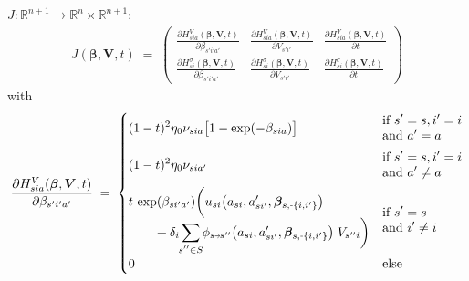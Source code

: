 \documentclass[11pt,fleqn]{article}
\newcommand{\R}{\mathbb{R}}
\newcommand{\bbeta}{\bm{\beta}}
\newcommand{\bV}{\bm{V}}
\newcommand{\shortminus}{{\text{\scalebox{0.4}[1.0]{\(-\)}}}}
\newcommand{\shortrightarrow}{\parbox{4pt}{\tikz{\draw[->](0,0)--(4pt,0);}}}
\begin{document}
$J: \R^{n+1} \rightarrow \R^n \times \R^{n+1}$:
\begin{align*}
	J(\bbeta,\bV,t) \;=\; 
		\begin{pmatrix}
			\frac{ \partial H^V_{sia}(\bbeta,\bV,t) }{ \partial\beta_{s'i'a'} } 
				& \frac{ \partial H^V_{sia}(\bbeta,\bV,t) }{ \partial V_{s'i'} } 
				& \frac{ \partial H^V_{sia}(\bbeta,\bV,t) }{ \partial t } \\[1em] 
			\frac{ \partial H^\sigma_{si}(\bbeta,\bV,t) }{ \partial \beta_{s'i'a'} } 
				& \frac{ \partial H^\sigma_{si}(\bbeta,\bV,t) }{ \partial V_{s'i'} } 
				& \frac{ \partial H^\sigma_{si}(\bbeta,\bV,t) }{ \partial t }
		\end{pmatrix} 
\end{align*}
with
\begin{align*}
	\frac{ \partial H^V_{sia}(\bbeta,\bV,t) }{ \partial \beta_{s'i'a'} } \;=\; 
		\begin{cases}
			\begin{aligned}
				& (1-t)^2\eta_0 \nu_{sia} \bigl[1-\exp(-\beta_{sia})\bigr]
			\end{aligned} & 
			\begin{aligned}
				& \text{if } s'=s, i'=i \\ &\text{and } a'=a
			\end{aligned} \\[1em]
			\begin{aligned}
				& (1-t)^2\eta_0 \nu_{sia'}
			\end{aligned} & 
			\begin{aligned}
				& \text{if } s'=s, i'=i \\ &\text{and } a'\neq a
			\end{aligned} \\[1em]
			\begin{aligned} 
				& t \, \exp(\beta_{si'a'}) \biggl( u_{si}\bigl(a_{si},a_{si'}',\bbeta_{s,\shortminus\{i,i'\}}\bigr) \\
				& \qquad + \delta_i \sum\limits_{\mathclap{s''\in S}} \phi_{s\shortrightarrow s''}\bigl(a_{si},a_{si'}',\bbeta_{s,\shortminus\{i,i'\}}\bigr) \; V_{s''i} \biggr)
			\end{aligned} & 
			\begin{aligned}
				& \text{if } s'=s \\ &\text{and } i'\neq i  
			\end{aligned} \\[1em]
			0 & \text{else}
		\end{cases}
\end{align*}
\end{document}
